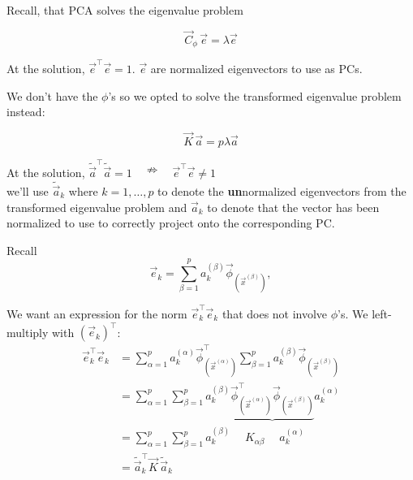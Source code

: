 \begin{frame}{\subsubsecname}

Recall, that PCA solves the eigenvalue problem

\begin{equation}
\vec C_{\phi} \, \vec e = \lambda \vec e
\end{equation}

At the solution, $\vec e^\top \vec e = 1$. $\vec e$ are normalized eigenvectors to use as PCs.

We don't have the $\phi$'s so we opted to solve the transformed eigenvalue problem instead:

\begin{equation}
	\vec{K} \, \vec{a} = p \lambda \vec{a}
\end{equation}

At the solution, $\widetilde{\vec a}^\top \widetilde{\vec a} = 1 \quad \nRightarrow \quad \vec e^\top \vec e \ne 1$\\

we'll use $\widetilde{\vec a}_k$ where $k=1,\ldots,p$ to denote the \textbf{un}normalized eigenvectors from the transformed eigenvalue problem and $\vec a_k$ to denote that the vector has been normalized to use to correctly project onto the corresponding PC.

\end{frame}

\begin{frame}{\subsubsecname}

Recall
\begin{equation}
\label{eq:ephik}
\vec e_k = \sum^{p}_{\beta=1} a_k^{(\beta)} \vec{\phi}_{(\vec{x}^{(\beta)})},
\end{equation}

We want an expression for the norm $\vec e^{\top}_k \vec e_k$ that does not involve $\phi$'s. We left-multiply with $\left(\vec e_k\right)^\top$:
\begin{align}
\vec e^{\top}_k \vec e_k &= \sum^{p}_{\alpha=1}  a_k^{(\alpha)} \vec{\phi}_{(\vec{x}^{(\alpha)})}^\top \sum^{p}_{\beta=1} a_k^{(\beta)} \vec{\phi}_{(\vec{x}^{(\beta)})} \\
&= \sum^{p}_{\alpha=1}  \sum^{p}_{\beta=1}  a_k^{(\beta)}  \underbrace{\vec{\phi}_{(\vec{x}^{(\alpha)})}^\top  \vec{\phi}_{(\vec{x}^{(\beta)})}} a_k^{(\alpha)} \\
&= \sum^{p}_{\alpha=1}  \sum^{p}_{\beta=1}  a_k^{(\beta)} \quad \; K_{\alpha\beta} \quad \; a_k^{(\alpha)} \\
&= \widetilde {\vec a}_k^\top \vec K \, \widetilde {\vec a}_k
\end{align}

\end{frame}

